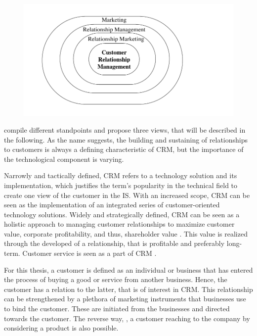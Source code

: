 		\begin{figure}[caption={CRM in the field of marketing}, label={fig:crmcirlces}]
			{	\includegraphics[width=.8\textwidth]{figures/crmcircles.pdf}}
		\end{figure}
	
		\cite{paynefrow2005} compile different standpoints and propose three views, that will be described in the following. As the name suggests, the building and sustaining of relationships to customers is always a defining characteristic of \acrshort{CRM}, but the importance of the technological component is varying. 
		
		Narrowly and tactically defined, \acrshort{CRM} refers to a technology solution and its implementation, which justifies the term's popularity in the technical field to create one view of the customer in the \acrshort{IS}. With an increased scope, \acrshort{CRM} can be seen as the implementation of an integrated series of customer-oriented technology solutions. Widely and strategically defined, \acrshort{CRM} can be seen as a holistic approach to managing customer relationships to maximize customer value, corporate profitability, and thus, shareholder value \cite{payne2004role}. This value is realized through the developed of a relationship, that is profitable and preferably long-term. Customer service is seen as a part of \acrshort{CRM} \citep[]{Helmke_2012}. 
	
		For this thesis, a customer is defined as an individual or business that has entered the process of buying a good or service from another business. Hence, the customer has a relation to the latter, that is of interest in CRM. This relationship can be strengthened by a plethora of marketing instruments that businesses use to bind the customer. These are initiated from the businesses and directed towards the customer. The reverse way, \ie, a customer reaching to the company by considering a product is also possible.  
		
